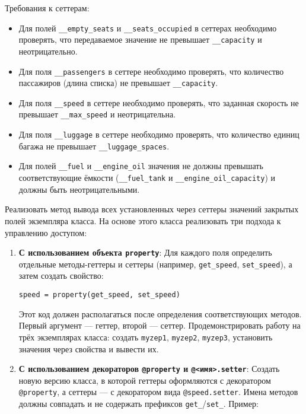 \begin{enumerate}
\begin{itemize}
\end{itemize}
Требования к сеттерам:
\begin{itemize}
    \item Для полей \texttt{\_\_empty\_seats} и \texttt{\_\_seats\_occupied} в сеттерах необходимо проверять, что передаваемое значение не превышает \texttt{\_\_capacity} и неотрицательно.  
    \item Для поля \texttt{\_\_passengers} в сеттере необходимо проверять, что количество пассажиров (длина списка) не превышает \texttt{\_\_capacity}.  
    \item Для поля \texttt{\_\_speed} в сеттере необходимо проверять, что заданная скорость не превышает \texttt{\_\_max\_speed} и неотрицательна.  
    \item Для поля \texttt{\_\_luggage} в сеттере необходимо проверять, что количество единиц багажа не превышает \texttt{\_\_luggage\_spaces}.
    \item Для полей \texttt{\_\_fuel} и \texttt{\_\_engine\_oil} значения не должны превышать соответствующие ёмкости (\texttt{\_\_fuel\_tank} и \texttt{\_\_engine\_oil\_capacity}) и должны быть неотрицательными.
\end{itemize}
Реализовать метод вывода всех установленных через сеттеры значений закрытых полей экземпляра класса.
На основе этого класса реализовать три подхода к управлению доступом:
\begin{enumerate}
    \item \textbf{С использованием объекта \texttt{property}}:  
    Для каждого поля определить отдельные методы-геттеры и сеттеры (например, \texttt{get\_speed}, \texttt{set\_speed}), а затем создать свойство:  
    \begin{verbatim}
speed = property(get_speed, set_speed)
    \end{verbatim}  
    Этот код должен располагаться после определения соответствующих методов. Первый аргумент — геттер, второй — сеттер.  
    Продемонстрировать работу на трёх экземплярах класса: создать \texttt{myzep1}, \texttt{myzep2}, \texttt{myzep3}, установить значения через свойства и вывести их.
    \item \textbf{С использованием декораторов \texttt{@property} и \texttt{@<имя>.setter}}:  
    Создать новую версию класса, в которой геттеры оформляются с декоратором \texttt{@property}, а сеттеры — с декоратором вида \texttt{@speed.setter}. Имена методов должны совпадать и не содержать префиксов \texttt{get\_}/\texttt{set\_}.  
    Пример:  
    \begin{verbatim}

\end{verbatim}
\end{enumerate}
\end{enumerate}
